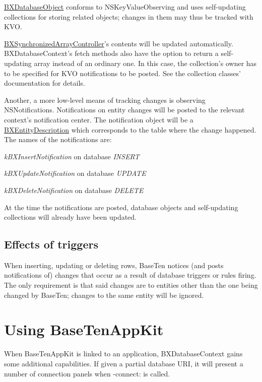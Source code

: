 \hyperlink{interface_b_x_database_object}{B\+X\+Database\+Object} conforms to N\+S\+Key\+Value\+Observing and uses self-\/updating collections for storing related objects; changes in them may thus be tracked with K\+V\+O.

\hyperlink{interface_b_x_synchronized_array_controller}{B\+X\+Synchronized\+Array\+Controller}'s contents will be updated automatically. B\+X\+Database\+Context's fetch methods also have the option to return a self-\/updating array instead of an ordinary one. In this case, the collection's owner has to be specified for K\+V\+O notifications to be posted. See the collection classes' documentation for details.

Another, a more low-\/level means of tracking changes is observing N\+S\+Notifications. Notifications on entity changes will be posted to the relevant context's notification center. The notification object will be a \hyperlink{interface_b_x_entity_description}{B\+X\+Entity\+Description} which corresponds to the table where the change happened. The names of the notifications are\+: \begin{DoxyItemize}
\item {\itshape k\+B\+X\+Insert\+Notification} on database {\itshape I\+N\+S\+E\+R\+T} \item {\itshape k\+B\+X\+Update\+Notification} on database {\itshape U\+P\+D\+A\+T\+E} \item {\itshape k\+B\+X\+Delete\+Notification} on database {\itshape D\+E\+L\+E\+T\+E}\end{DoxyItemize}
At the time the notifications are posted, database objects and self-\/updating collections will already have been updated.\hypertarget{tracking_changes_trigger_effects}{}\subsection{Effects of triggers}\label{tracking_changes_trigger_effects}
When inserting, updating or deleting rows, Base\+Ten notices (and posts notifications of) changes that occur as a result of database triggers or rules firing. The only requirement is that said changes are to entities other than the one being changed by Base\+Ten; changes to the same entity will be ignored. \hypertarget{using_appkit_classes}{}\section{Using Base\+Ten\+App\+Kit}\label{using_appkit_classes}
When Base\+Ten\+App\+Kit is linked to an application, B\+X\+Database\+Context gains some additional capabilities. If given a partial database U\+R\+I, it will present a number of connection panels when -\/connect\+: is called.

